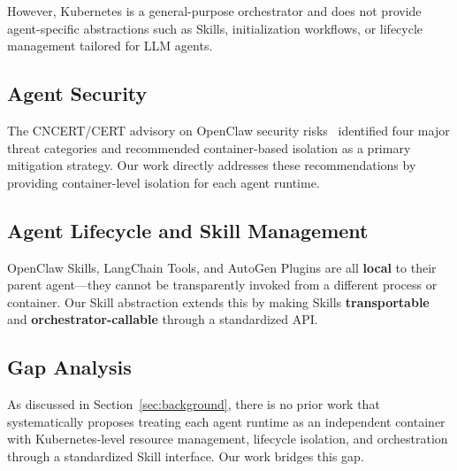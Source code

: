 However, Kubernetes is a general-purpose orchestrator and does not provide agent-specific abstractions such as Skills, initialization workflows, or lifecycle management tailored for LLM agents.

\subsection{Agent Security}

The CNCERT/CERT advisory on OpenClaw security risks~\citep{cncert2026openclaw} identified four major threat categories and recommended container-based isolation as a primary mitigation strategy. Our work directly addresses these recommendations by providing container-level isolation for each agent runtime.

\subsection{Agent Lifecycle and Skill Management}

OpenClaw Skills, LangChain Tools, and AutoGen Plugins are all \textbf{local} to their parent agent---they cannot be transparently invoked from a different process or container. Our Skill abstraction extends this by making Skills \textbf{transportable} and \textbf{orchestrator-callable} through a standardized API.

\subsection{Gap Analysis}

As discussed in Section~\ref{sec:background}, there is no prior work that systematically proposes treating each agent runtime as an independent container with Kubernetes-level resource management, lifecycle isolation, and orchestration through a standardized Skill interface. Our work bridges this gap.
